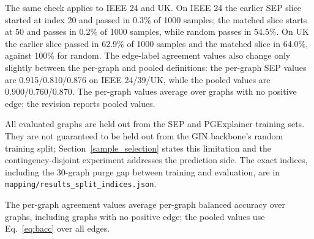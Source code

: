 The same check applies to IEEE 24 and UK. On IEEE 24 the earlier SEP slice started at index 20 and passed in 0.3\% of 1000 samples; the matched slice starts at 50 and passes in 0.2\% of 1000 samples, while random passes in 54.5\%. On UK the earlier slice passed in 62.9\% of 1000 samples and the matched slice in 64.0\%, against 100\% for random. The edge-label agreement values also change only slightly between the per-graph and pooled definitions: the per-graph SEP values are 0.915/0.810/0.876 on IEEE 24/39/UK, while the pooled values are 0.900/0.760/0.870. The per-graph values average over graphs with no positive edge; the revision reports pooled values.

All evaluated graphs are held out from the SEP and PGExplainer training sets. They are not guaranteed to be held out from the GIN backbone's random training split; Section~\ref{sample_selection} states this limitation and the contingency-disjoint experiment addresses the prediction side. The exact indices, including the 30-graph purge gap between training and evaluation, are in \texttt{mapping/results\_split\_indices.json}.

\begin{table}[!htbp]
\centering
\caption{Effect of the evaluation-start choice on the IEEE 39 SEP comparison, with the corresponding IEEE 24 and UK checks. PFR is the restricted AC screening pass rate. The matched slice is used in all main tables.}
\label{tab:matched}
\scriptsize
{}
\begin{flushleft}
\footnotesize
The per-graph agreement values average per-graph balanced accuracy over graphs, including graphs with no positive edge; the pooled values use Eq.~\eqref{eq:bacc} over all edges.
\end{flushleft}
\end{table}



